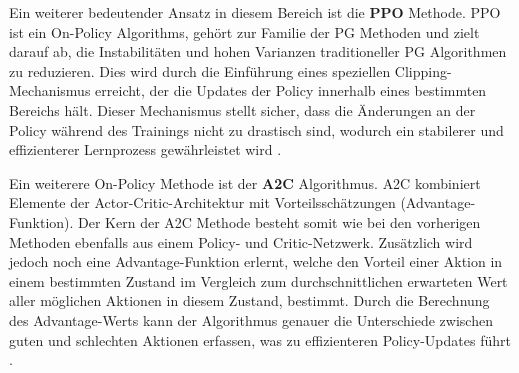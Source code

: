 \documentclass[twocolumn]{webofc}
\begin{document}
Ein weiterer bedeutender Ansatz in diesem Bereich ist die \textbf{\ac{PPO}} Methode. \ac{PPO} ist ein On-Policy Algorithms, gehört zur Familie der \ac{PG} Methoden und zielt darauf ab, die Instabilitäten und hohen Varianzen traditioneller \ac{PG} Algorithmen zu reduzieren. Dies wird durch die Einführung eines speziellen Clipping-Mechanismus erreicht, der die Updates der Policy innerhalb eines bestimmten Bereichs hält. Dieser Mechanismus stellt sicher, dass die Änderungen an der Policy während des Trainings nicht zu drastisch sind, wodurch ein stabilerer und effizienterer Lernprozess gewährleistet wird \cite{SchulmanWDRK17}.

Ein weiterere On-Policy Methode ist der \textbf{\ac{A2C}} Algorithmus.
\ac{A2C} kombiniert Elemente der Actor-Critic-Architektur mit Vorteilsschätzungen (Advantage-Funktion). Der Kern der \ac{A2C} Methode besteht somit wie bei den vorherigen Methoden ebenfalls aus einem Policy- und Critic-Netzwerk. Zusätzlich wird jedoch noch eine Advantage-Funktion erlernt, welche den Vorteil einer Aktion in einem bestimmten Zustand im Vergleich zum durchschnittlichen erwarteten Wert aller möglichen Aktionen in diesem Zustand, bestimmt. Durch die Berechnung des Advantage-Werts kann der Algorithmus genauer die Unterschiede zwischen guten und schlechten Aktionen erfassen, was zu effizienteren Policy-Updates führt \cite{MnihBMGLHSK16}.


\end{document}
